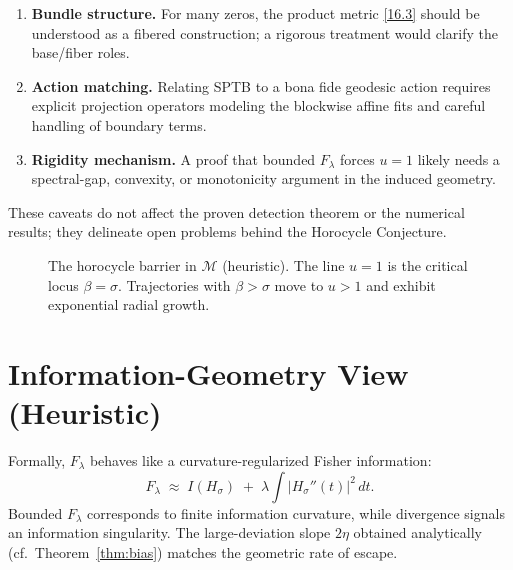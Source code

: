 \begin{enumerate}
  \item \textbf{Bundle structure.} For many zeros, the product metric \eqref{16.3} should be
  understood as a fibered construction; a rigorous treatment would clarify the base/fiber roles.
  \item \textbf{Action matching.} Relating SPTB to a bona fide geodesic action requires explicit
  projection operators modeling the blockwise affine fits and careful handling of boundary terms.
  \item \textbf{Rigidity mechanism.} A proof that bounded $F_\lambda$ forces $u=1$ likely needs
  a spectral-gap, convexity, or monotonicity argument in the induced geometry.
\end{enumerate}

These caveats do not affect the proven detection theorem or the numerical results;
they delineate open problems behind the Horocycle Conjecture.

\begin{figure}[h]
\centering
{}
\caption{The horocycle barrier in $\mathcal{M}$ (heuristic).
The line $u=1$ is the critical locus $\beta=\sigma$. Trajectories with $\beta>\sigma$
move to $u>1$ and exhibit exponential radial growth.}
\label{fig:horocycle}
\end{figure}

\section{Information-Geometry View (Heuristic)}\label{sec:geom-preview}

Formally, $F_\lambda$ behaves like a curvature-regularized Fisher information:
\[
F_\lambda \;\approx\; I(H_\sigma) \;+\; \lambda\!\int |H_\sigma''(t)|^2\,dt.
\]
Bounded $F_\lambda$ corresponds to finite information curvature, while divergence
signals an information singularity. The large-deviation slope $2\eta$ obtained
analytically (cf.\ Theorem~\ref{thm:bias}) matches the geometric rate of escape.

